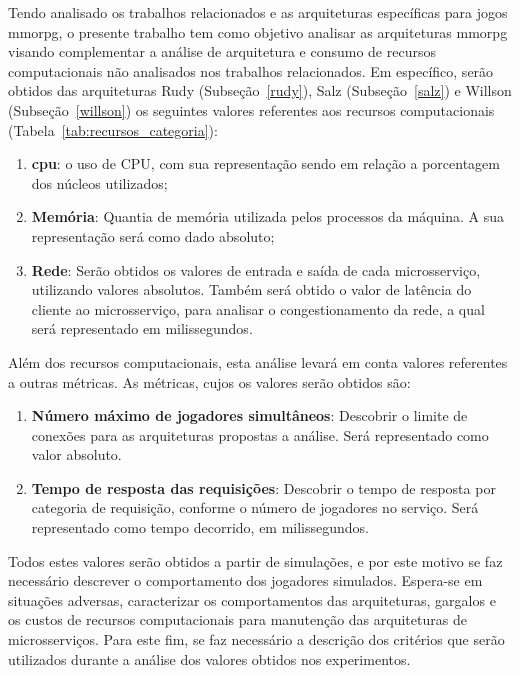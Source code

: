 Tendo analisado os trabalhos relacionados e as arquiteturas específicas para jogos \ac{mmorpg}, o presente trabalho tem como objetivo analisar as arquiteturas \ac{mmorpg} visando complementar a análise de arquitetura e consumo de recursos computacionais não analisados nos trabalhos relacionados.
%
Em específico, serão obtidos das arquiteturas Rudy (Subseção~\ref{rudy}), Salz (Subseção~\ref{salz}) e Willson (Subseção~\ref{willson}) os seguintes valores referentes aos recursos computacionais (Tabela~\ref{tab:recursos_categoria}):

\begin{enumerate}
  \item \textbf{\ac{cpu}}: o uso de CPU, com sua representação sendo em relação a porcentagem dos núcleos utilizados;
  \item \textbf{Memória}: Quantia de memória utilizada pelos processos da máquina. A sua representação será como dado absoluto;
  \item \textbf{Rede}: Serão obtidos os valores de entrada e saída de cada microsserviço, utilizando valores absolutos. Também será obtido o valor de latência do cliente ao microsserviço, para analisar o congestionamento da rede, a qual será representado em milissegundos.
\end{enumerate}

Além dos recursos computacionais, esta análise levará em conta valores referentes a outras métricas.
%
As métricas, cujos os valores serão obtidos são:

\begin{enumerate}
  \item \textbf{Número máximo de jogadores simultâneos}: Descobrir o limite de conexões para as arquiteturas propostas a análise. Será representado como valor absoluto.
  \item \textbf{Tempo de resposta das requisições}: Descobrir o tempo de resposta por categoria de requisição, conforme o número de jogadores no serviço. Será representado como tempo decorrido, em milissegundos.
\end{enumerate}

Todos estes valores serão obtidos a partir de simulações, e por este motivo se faz necessário descrever o comportamento dos jogadores simulados.
%
Espera-se em situações adversas, caracterizar os comportamentos das arquiteturas, gargalos e os custos de recursos computacionais para manutenção das arquiteturas de microsserviços.
%
Para este fim, se faz necessário a descrição dos critérios que serão utilizados durante a análise dos valores obtidos nos experimentos.


